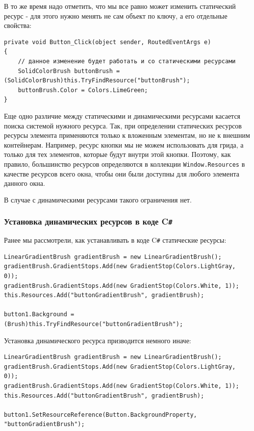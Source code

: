 В то же время надо отметить, что мы все равно может изменить статический ресурс - для этого нужно менять не сам объект по ключу, а его отдельные свойства:

\begin{verbatim}
private void Button_Click(object sender, RoutedEventArgs e)
{
    // данное изменение будет работать и со статическими ресурсами
    SolidColorBrush buttonBrush = (SolidColorBrush)this.TryFindResource("buttonBrush");
    buttonBrush.Color = Colors.LimeGreen;
}
\end{verbatim}


Еще одно различие между статическими и динамическими ресурсами касается поиска системой нужного ресурса. Так, при определении статических ресурсов ресурсы элемента применяются только к вложенным элементам, но не к внешним контейнерам. Например, ресурс кнопки мы не можем использовать для грида, а только для тех элементов, которые будут внутри этой кнопки. Поэтому, как правило, большинство ресурсов определяются в коллекции \texttt{Window.Resources} в качестве ресурсов всего окна, чтобы они были доступны для любого элемента данного окна.

В случае с динамическими ресурсами такого ограничения нет.

\subsubsection{Установка динамических ресурсов в коде C\texttt{\#}}

Ранее мы рассмотрели, как устанавливать в коде C\texttt{\#} статические ресурсы:

\begin{verbatim}
LinearGradientBrush gradientBrush = new LinearGradientBrush();
gradientBrush.GradientStops.Add(new GradientStop(Colors.LightGray, 0));
gradientBrush.GradientStops.Add(new GradientStop(Colors.White, 1));
this.Resources.Add("buttonGradientBrush", gradientBrush);
 
button1.Background = (Brush)this.TryFindResource("buttonGradientBrush");
\end{verbatim}

Установка динамического ресурса призводится немного иначе:

\begin{verbatim}
LinearGradientBrush gradientBrush = new LinearGradientBrush();
gradientBrush.GradientStops.Add(new GradientStop(Colors.LightGray, 0));
gradientBrush.GradientStops.Add(new GradientStop(Colors.White, 1));
this.Resources.Add("buttonGradientBrush", gradientBrush);
 
button1.SetResourceReference(Button.BackgroundProperty, "buttonGradientBrush");
\end{verbatim}

